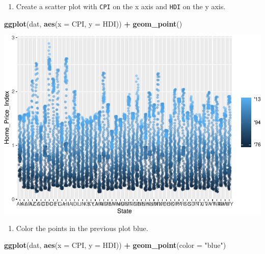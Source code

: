 \documentclass[
]{book}
\newenvironment{Shaded}{\begin{snugshade}}{\end{snugshade}}
\newcommand{\DataTypeTok}[1]{\textcolor[rgb]{0.13,0.29,0.53}{#1}}
\newcommand{\KeywordTok}[1]{\textcolor[rgb]{0.13,0.29,0.53}{\textbf{#1}}}
\newcommand{\NormalTok}[1]{#1}
\newcommand{\OperatorTok}[1]{\textcolor[rgb]{0.81,0.36,0.00}{\textbf{#1}}}
\newcommand{\StringTok}[1]{\textcolor[rgb]{0.31,0.60,0.02}{#1}}
\providecommand{\tightlist}{%
  \setlength{\itemsep}{0pt}\setlength{\parskip}{0pt}}
\begin{document}
\begin{alert}

\begin{enumerate}
\def\labelenumi{\arabic{enumi}.}
\tightlist
\item
  Create a scatter plot with \texttt{CPI} on the x axis and \texttt{HDI} on the y axis.
\end{enumerate}

\begin{Shaded}
\begin{Highlighting}[]
\KeywordTok{ggplot}\NormalTok{(dat, }\KeywordTok{aes}\NormalTok{(}\DataTypeTok{x =}\NormalTok{ CPI, }\DataTypeTok{y =}\NormalTok{ HDI)) }\OperatorTok{+}
\StringTok{  }\KeywordTok{geom\_point}\NormalTok{()}
\end{Highlighting}
\end{Shaded}

\includegraphics{R/Rgraphics/figures/unnamed-chunk-174-1.pdf}

\begin{enumerate}
\def\labelenumi{\arabic{enumi}.}
\setcounter{enumi}{1}
\tightlist
\item
  Color the points in the previous plot blue.
\end{enumerate}

\begin{Shaded}
\begin{Highlighting}[]
\KeywordTok{ggplot}\NormalTok{(dat, }\KeywordTok{aes}\NormalTok{(}\DataTypeTok{x =}\NormalTok{ CPI, }\DataTypeTok{y =}\NormalTok{ HDI)) }\OperatorTok{+}
\StringTok{  }\KeywordTok{geom\_point}\NormalTok{(}\DataTypeTok{color =} \StringTok{"blue"}\NormalTok{)}
\end{Highlighting}
\end{Shaded}


\end{alert}
\end{document}
